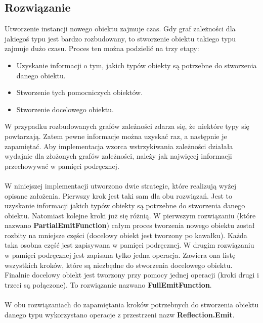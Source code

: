 \documentclass[12pt]{article}
\begin{document}
\subsection{Rozwiązanie}
Utworzenie instancji nowego obiektu zajmuje czas. Gdy graf zależności dla jakiegoś typu jest bardzo rozbudowany, to stworzenie obiektu takiego typu zajmuje dużo czasu. Proces ten można podzielić na trzy etapy:
\begin{itemize}
	\item Uzyskanie informacji o tym, jakich typów obiekty są potrzebne do stworzenia danego obiektu.
	\item Stworzenie tych pomocniczych obiektów.
	\item Stworzenie docelowego obiektu.
\end{itemize}
W przypadku rozbudowanych grafów zależności zdarza się, że niektóre typy się powtarzają. Zatem pewne informacje można uzyskać raz, a następnie je zapamiętać. Aby implementacja wzorca wstrzykiwania zależności działała wydajnie dla złożonych grafów zależności, należy jak najwięcej informacji przechowywać w pamięci podręcznej.\\
\\
W niniejszej implementacji utworzono dwie strategie, które realizują wyżej opisane założenia. Pierwszy krok jest taki sam dla obu rozwiązań. Jest to uzyskanie informacji jakich typów obiekty są potrzebne do stworzenia danego obiektu. Natomiast kolejne kroki już się różnią. W pierwszym rozwiązaniu (które nazwano \textbf{PartialEmitFunction}) całym proces tworzenia nowego obiektu został rozbity na mniejsze części (docelowy obiekt jest tworzony po kawałku). Każda taka osobna część jest zapisywana w pamięci podręcznej. W drugim rozwiązaniu w pamięci podręcznej jest zapisana tylko jedna operacja. Zawiera ona listę wszystkich kroków, które są niezbędne do stworzenia docelowego obiektu. Finalnie docelowy obiekt jest tworzony przy pomocy jednej operacji (kroki drugi i trzeci są połączone). To rozwiązanie nazwano \textbf{FullEmitFunction}.\\
\\
W obu rozwiązaniach do zapamiętania kroków potrzebnych do stworzenia obiektu danego typu wykorzystano operacje z przestrzeni nazw \textbf{Reflection.Emit}.
\end{document}
